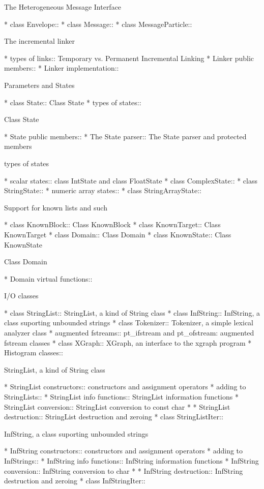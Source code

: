 \begin{menu}
The Heterogeneous Message Interface

* class Envelope::		
* class Message::		
* class MessageParticle::	

The incremental linker

* types of links::		Temporary vs. Permanent Incremental Linking
* Linker public members::	
* Linker implementation::	

Parameters and States

* class State::			Class State
* types of states::		

Class State

* State public members::	
* The State parser::		The State parser and protected members

types of states

* scalar states::		class IntState and class FloatState
* class ComplexState::		
* class StringState::		
* numeric array states::	
* class StringArrayState::	

Support for known lists and such

* class KnownBlock::		Class KnownBlock
* class KnownTarget::		Class KnownTarget
* class Domain::		Class Domain
* class KnownState::		Class KnownState

Class Domain

* Domain virtual functions::	

I/O classes

* class StringList::		StringList, a kind of String class
* class InfString::		InfString, a class suporting unbounded strings
* class Tokenizer::		Tokenizer, a simple lexical analyzer class
* augmented fstreams::		pt_ifstream and pt_ofstream: augmented fstream classes
* class XGraph::		XGraph, an interface to the xgraph program
* Histogram classes::		

StringList, a kind of String class

* StringList constructors::	constructors and assignment operators
* adding to StringLists::	
* StringList info functions::	StringList information functions
* StringList conversion::	StringList conversion to const char *
* StringList destruction::	StringList destruction and zeroing
* class StringListIter::	

InfString, a class suporting unbounded strings

* InfString constructors::	constructors and assignment operators
* adding to InfStrings::	
* InfString info functions::	InfString information functions
* InfString conversion::	InfString conversion to char *
* InfString destruction::	InfString destruction and zeroing
* class InfStringIter::		


\end{menu}

